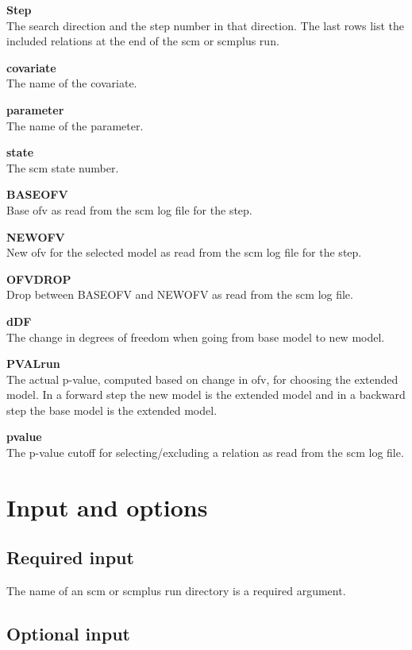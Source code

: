 {\bfseries Step}\\
The search direction and the step number in that direction. The last rows list the included relations
at the end of the scm or scmplus run.

{\bfseries covariate}\\
The name of the covariate.

{\bfseries parameter}\\
The name of the parameter.

{\bfseries state}\\
The scm state number.

{\bfseries BASEOFV}\\
Base ofv as read from the scm log file for the step.

{\bfseries NEWOFV}\\
New ofv for the selected model as read from the scm log file for the step.

{\bfseries OFVDROP}\\
Drop between BASEOFV and NEWOFV as read from the scm log file.

{\bfseries dDF}\\
The change in degrees of freedom when going from base model to new model.

{\bfseries PVALrun}\\
The actual p-value, computed based on change in ofv, for choosing the extended model.
In a forward step the new model is the extended model and in a backward step the base model is the extended model.

{\bfseries pvalue}\\
The p-value cutoff for selecting/excluding a relation as read from the scm log file.

\newpage

\section{Input and options}

\subsection{Required input}
The name of an scm or scmplus run directory is a required argument.

\subsection{Optional input}

